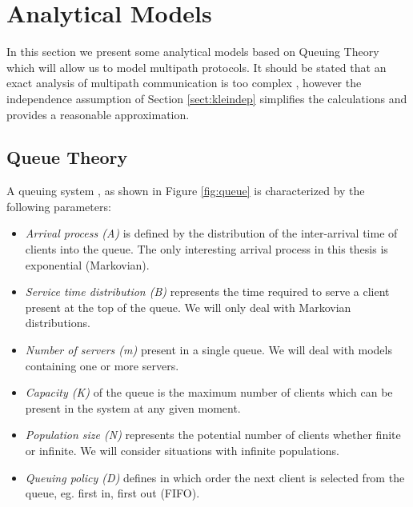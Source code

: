 

\section{Analytical Models}

In this section we present some analytical models based on Queuing Theory which will allow us to model multipath protocols. It should be stated that an exact analysis of multipath communication is too complex \cite{CommNets}, however the independence assumption of Section \ref{sect:kleindep} simplifies the calculations and provides a reasonable approximation. 

\subsection{Queue Theory}
\label{sect:queues}

A queuing system \cite{KLEVol1}, as shown in Figure \ref{fig:queue} is characterized by the following parameters:


\begin{itemize}
 \item \textit{Arrival process (A)} is defined by the distribution of the inter-arrival time of clients into the queue. The only interesting arrival process in this thesis is exponential (Markovian).
 \item \textit{Service time distribution (B)} represents the time required to serve a client present at the top of the queue. We will only deal with Markovian distributions.
 \item \textit{Number of servers (m)} present in a single queue. We will deal with models containing one or more servers.
 \item \textit{Capacity (K)} of the queue is the maximum number of clients which can be present in the system at any given moment.
 \item \textit{Population size (N)} represents the potential number of clients whether finite or infinite. We will consider situations with infinite populations.
 \item \textit{Queuing policy (D)} defines in which order the next client is selected from the queue, eg. first in, first out (FIFO).
\end{itemize}

